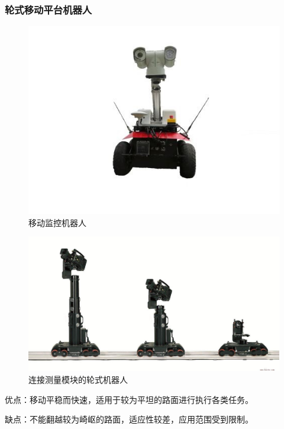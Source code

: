 \documentclass[12pt]{article}
\begin{document}
\begin{CJK}{UTF8}{song}
\subsubsection{轮式移动平台机器人}
\renewcommand {\thefigure} {\thesubsection{}.\arabic{figure}}
\begin{figure}[H]
\centering
\includegraphics[width=.8\textwidth]{chap1//fig1.jpg}
\caption{移动监控机器人}
\end{figure}
\begin{figure}[H]
\centering
\includegraphics[width=.8\textwidth]{chap1//fig2.jpg}
\caption{连接测量模块的轮式机器人}
\end{figure}
优点：移动平稳而快速，适用于较为平坦的路面进行执行各类任务。\par
缺点：不能翻越较为崎岖的路面，适应性较差，应用范围受到限制。


\end{CJK}
\end{document}
